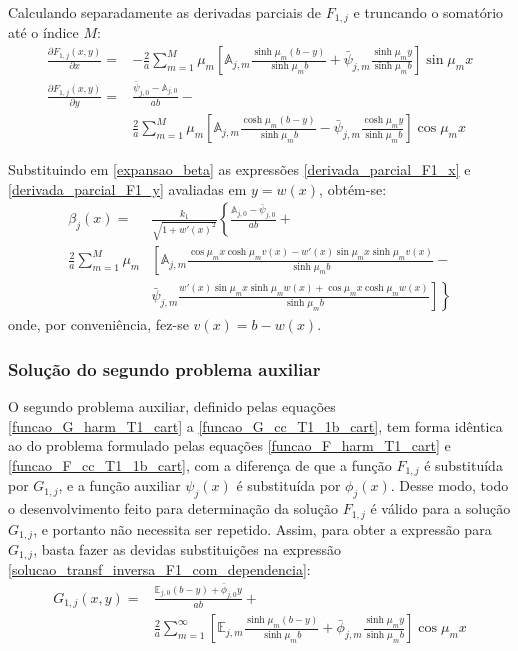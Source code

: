 Calculando separadamente as derivadas parciais de $F_{1, j}$ e truncando o somatório até o índice $M$:
\begin{align}
\frac{\partial F_{1, j}(x, y)}{\partial x} = & -\frac{2}{a}\sum_{m=1}^M \mu_m \left[\mathbb{A}_{j,m}\frac{\sinh\mu_m (b - y)}{\sinh\mu_m b} + \bar{\psi}_{j, m}\frac{\sinh\mu_m y}{\sinh\mu_m b}\right]\sin\mu_m x
\label{derivada_parcial_F1_x} \\
\frac{\partial F_{1, j}(x, y)}{\partial y} = & \frac{\bar{\psi}_{j,0} - \mathbb{A}_{j,0}}{ab} - \nonumber \\
&\frac{2}{a}\sum_{m=1}^M \mu_m \left[\mathbb{A}_{j,m}\frac{\cosh\mu_m (b - y)}{\sinh\mu_m b} - \bar{\psi}_{j, m}\frac{\cosh\mu_m y}{\sinh\mu_m b}\right]\cos\mu_m x
\label{derivada_parcial_F1_y}
\end{align}

Substituindo em \eqref{expansao_beta} as expressões \eqref{derivada_parcial_F1_x} e \eqref{derivada_parcial_F1_y} avaliadas em $y = w(x)$, obtém-se:
\begin{align}
\beta_j(x) = & \frac{k_1}{\sqrt{1 + w'(x)^2}}\left\lbrace \frac{\mathbb{A}_{j,0} - \bar{\psi}_{j,0}}{ab} \right.  + \nonumber \\
\frac{2}{a}\sum_{m=1}^M \mu_m & \left[ \mathbb{A}_{j,m}\frac{\cos\mu_m x\cosh\mu_m v(x) - w'(x)\sin\mu_m x\sinh\mu_m v(x)}{\sinh\mu_m b} \right. - \nonumber \\
&\left. \left. \bar{\psi}_{j, m}\frac{w'(x)\sin\mu_m x\sinh\mu_m w(x) + \cos\mu_m x\cosh\mu_m w(x)}{\sinh\mu_m b}\right] \right\rbrace
\label{serie_para_beta}
\end{align}
onde, por conveniência, fez-se $v(x) = b - w(x)$.



\subsubsection{Solução do segundo problema auxiliar}\label{secao_reciprocidade_G}

O segundo problema auxiliar, definido pelas equações \eqref{funcao_G_harm_T1_cart} a \eqref{funcao_G_cc_T1_1b_cart}, tem forma idêntica ao do problema formulado pelas equações \eqref{funcao_F_harm_T1_cart} e \eqref{funcao_F_cc_T1_1b_cart}, com a diferença
de que a função $F_{1, j}$ é substituída por $G_{1, j}$, e a função auxiliar $\psi_j(x)$ é substituída por $\phi_j(x)$.
Desse modo, todo o desenvolvimento feito para determinação da solução $F_{1, j}$ é válido para a solução $G_{1, j}$, e portanto não necessita ser repetido. Assim, para obter a expressão para $G_{1, j}$, 
basta fazer as devidas substituições na expressão \eqref{solucao_transf_inversa_F1_com_dependencia}:
\begin{align}
G_{1, j}(x, y) = & \frac{\mathbb{E}_{j,0}(b - y) + \bar{\phi}_{j,0}y}{ab} + \nonumber \\
&\frac{2}{a}\sum_{m=1}^\infty\left[\mathbb{E}_{j,m}\frac{\sinh\mu_m (b - y)}{\sinh\mu_m b} + \bar{\phi}_{j, m}\frac{\sinh\mu_m y}{\sinh\mu_m b}\right]\cos\mu_m x
\label{solucao_transf_inversa_G1_com_dependencia}
\end{align}

